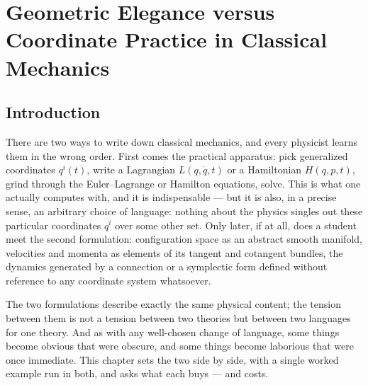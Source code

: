 %
%
%

\chapter{Geometric Elegance versus Coordinate Practice in Classical
  Mechanics}
\label{chap:geometric-vs-coordinate}

\section{Introduction}

There are two ways to write down classical mechanics, and every
physicist learns them in the wrong order. First comes the practical
apparatus: pick generalized coordinates $q^i(t)$, write a Lagrangian
$L(q,\dot q,t)$ or a Hamiltonian $H(q,p,t)$, grind through the
Euler--Lagrange or Hamilton equations, solve. This is what one
actually computes with, and it is indispensable --- but it is also,
in a precise sense, an arbitrary choice of language: nothing about
the physics singles out these particular coordinates $q^i$ over some
other set. Only later, if at all, does a student meet the second
formulation: configuration space as an abstract smooth manifold,
velocities and momenta as elements of its tangent and cotangent
bundles, the dynamics generated by a connection or a symplectic
form defined without reference to any coordinate system whatsoever.

The two formulations describe exactly the same physical content; the
tension between them is not a tension between two theories but
between two languages for one theory. And as with any well-chosen
change of language, some things become obvious that were obscure,
and some things become laborious that were once immediate. This
chapter sets the two side by side, with a single worked example run
in both, and asks what each buys --- and costs.

